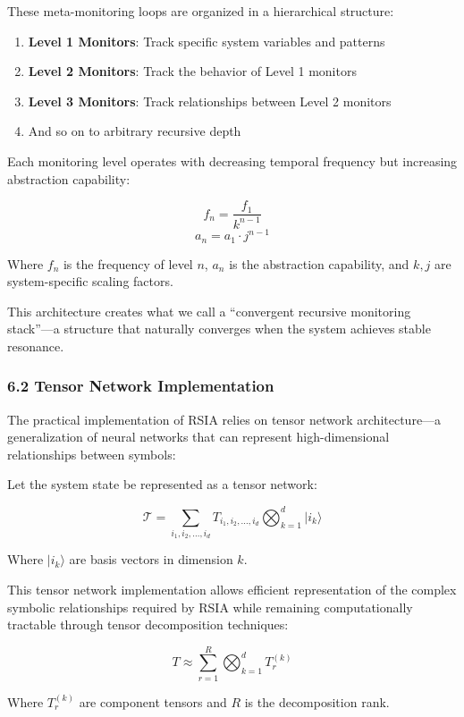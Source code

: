 \documentclass[12pt]{article}
\providecommand{\tightlist}{%
  \setlength{\itemsep}{0pt}\setlength{\parskip}{0pt}}
\begin{document}
These meta-monitoring loops are organized in a hierarchical structure:

\begin{enumerate}
\def\labelenumi{\arabic{enumi}.}
\tightlist{}
\item
  \textbf{Level 1 Monitors}: Track specific system variables and
  patterns
\item
  \textbf{Level 2 Monitors}: Track the behavior of Level 1 monitors
\item
  \textbf{Level 3 Monitors}: Track relationships between Level 2
  monitors
\item
  And so on to arbitrary recursive depth
\end{enumerate}

Each monitoring level operates with decreasing temporal frequency but
increasing abstraction capability:

\[f_n = \frac{f_1}{k^{n-1}}\] \[a_n = a_1 \cdot j^{n-1}\]

Where \(f_n\) is the frequency of level \(n\), \(a_n\) is the
abstraction capability, and \(k, j\) are system-specific scaling
factors.

This architecture creates what we call a ``convergent recursive
monitoring stack''---a structure that naturally converges when the
system achieves stable resonance.

\subsubsection{6.2 Tensor Network
Implementation}\label{tensor-network-implementation}

The practical implementation of RSIA relies on tensor network
architecture---a generalization of neural networks that can represent
high-dimensional relationships between symbols:

Let the system state be represented as a tensor network:

\[\mathcal{T} = \sum_{i_1, i_2, ..., i_d} T_{i_1, i_2, ..., i_d} \bigotimes_{k=1}^d |i_k\rangle\]

Where \(|i_k\rangle\) are basis vectors in dimension \(k\).

This tensor network implementation allows efficient representation of
the complex symbolic relationships required by RSIA while remaining
computationally tractable through tensor decomposition techniques:

\[T \approx \sum_{r=1}^R \bigotimes_{k=1}^d T^{(k)}_r\]

Where \(T^{(k)}_r\) are component tensors and \(R\) is the decomposition
rank.
\end{document}
